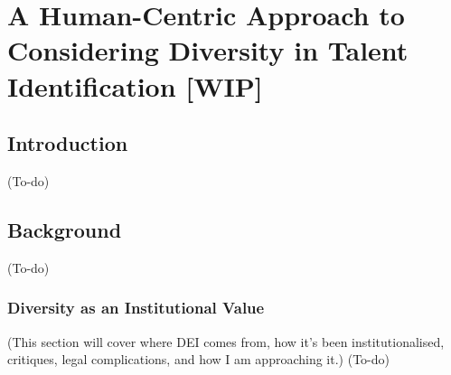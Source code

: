 

\chapter{\label{ch:iaicodesign}A Human-Centric Approach to Considering Diversity in Talent Identification [WIP]} %



\minitoc

\section{Introduction}
(To-do)

\section{Background}
(To-do)

\subsection{Diversity as an Institutional Value}
(This section will cover where DEI comes from, how it's been institutionalised, critiques, legal complications, and how I am approaching it.)
(To-do)



